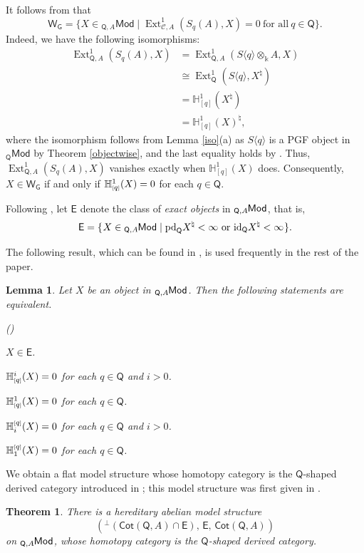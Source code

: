 \documentclass{amsart}
\theoremstyle{bfupright head,slanted body}
\theoremstyle{bfupright head,upright body}
\theoremstyle{fixed bf head,slanted body}
\newtheorem{thm}[res]{Theorem}          \newtheorem*{thm*}{Theorem}
\newtheorem{lem}[res]{Lemma}            \newtheorem*{lem*}{Lemma}
\theoremstyle{fixed bf head,upright body}
\theoremstyle{numbered paragraph}
\newlength{\thmlistleft}        %
\newlength{\thmlistright}       %
\newlength{\thmlistpartopsep}   %
\newlength{\thmlisttopsep}      %
\newlength{\thmlistparsep}      %
\newlength{\thmlistitemsep}     %
\newcounter{eqc}
\newenvironment{eqc}{\begin{list}{\upshape (\textit{\roman{eqc}})}%
		{\usecounter{eqc}%
			\setlength{\leftmargin}{\thmlistleft}%
			\setlength{\labelwidth}{\thmlistleft}%
			\setlength{\rightmargin}{\thmlistright}%
			\setlength{\partopsep}{\thmlistpartopsep}%
			\setlength{\topsep}{\thmlisttopsep}%
			\setlength{\parsep}{\thmlistparsep}%
			\setlength{\itemsep}{\thmlistitemsep}}}%
	{\end{list}}%
\newenvironment{prf*}[1][Proof]{%
	\begin{proof}[\bf #1]
		\setcounter{equation}{0}
		\renewcommand{\theequation}{\arabic{equation}}}
	{\end{proof}
}
\numberwithin{equation}{res}
\newcommand{\setof}[3][\mspace{1mu}]{\{#1#2 \mid #3#1\}}
\newcommand{\Cot}[1]{\mathsf{Cot}(#1)}
\newcommand{\Mod}[1]{{_{#1}\mathsf{Mod}}}
\newcommand{\Ext}[4][]{\operatorname{Ext}_{#1}^{#2}(#3,#4)}
\newcommand{\hH}[2][1]{\mathbb{H}_{#1}^{\textnormal{\tiny[}#2\textnormal{\tiny]}}}
\newcommand{\cH}[2][1]{\mathbb{H}^{#1}_{\textnormal{\tiny[}#2\textnormal{\tiny]}}}
\newcommand{\E}{\mathsf{E}}
\newcommand{\WG}{\mathsf{W}_{\mathsf{G}}}
\newcommand{\C}{\mathcal{C}}
\newcommand{\Q}{\mathsf{Q}}
\newcommand{\pd}{\mbox{\rm pd}}
\newcommand{\id}{\mathrm{id}}
\newcommand{\kk}{\Bbbk}
\newcommand{\lMod}[1]{{}_{#1}\mspace{-1mu}{\sf{Mod}}}
\begin{document}
\begin{prf*}
It follows from \cite[Lemma 5.1]{SV26} that
$$\WG=\{X\in \Mod{\Q,A}\mid \Ext[\C,A]{1}{S_{q}(A)}{X}=0 \ \text{for all} \ q\in \Q \}.$$
Indeed, we have the following isomorphisms:
\begin{align*}
\Ext[\Q,A]{1}{S_{q}(A)}{X}&=\Ext[\Q,A]{1}{S\langle q\rangle\otimes_{\kk}A}{X}\\
&\cong\Ext[\Q]{1}{S\langle q\rangle}{X^{\natural}}\\
&= \mathbb{H}_{[q]}^{1}(X^{\natural})\\
&= \mathbb{H}_{[q]}^{1}(X)^{\natural},
\end{align*}
where the isomorphism follows from Lemma \ref{iso}(a) as $S\langle q\rangle$ is a PGF object in $\Mod{\Q}$ by Theorem \ref{objectwise}, and
the last equality holds by \cite[Remark 7.12]{HJ21}.
Thus, $\Ext[\Q,A]{1}{S_{q}(A)}{X}$ vanishes exactly when $\mathbb{H}_{[q]}^{1}(X)$ does. Consequently, $X\in\WG$ if and only if $\cH[1]{q}(X)=0$ for each $q\in\Q$.
\end{prf*}

Following \cite[Definition 4.1]{HJ21}, let $\E$ denote the class of \emph{exact objects} in $\lMod{\Q,A}$, that is,
$$\E=\setof{X\in\lMod{\Q,A}}{\pd_{\Q}X^{\natural}<\infty\ \mathrm{or}\ \id_{\Q}X^{\natural}<\infty}.$$

The following result, which can be found in \cite[Theorem 7.1]{HJ21}, is used frequently in the rest of the paper.

\begin{lem}\label{thm7.1}
Let $X$ be an object in $\lMod{\Q,A}$. Then the following statements are equivalent.
\begin{eqc}
\item $X\in\E$.
\item $\cH[i]{q}{(X)}=0$ for each $q\in\Q$ and $i>0$.
\item $\cH[1]{q}{(X)}=0$ for each $q\in\Q$.
\item $\hH[i]{q}{(X)}=0$ for each $q\in\Q$ and $i>0$.
\item $\hH[1]{q}{(X)}=0$ for each $q\in\Q$.
\end{eqc}
\end{lem}

We obtain a flat model structure whose homotopy category is the $\Q$-shaped derived category introduced in \cite{HJ21}; this model structure was first given in \cite[Corollary 2.8]{DLLM}.

\begin{thm}\label{flat model structure}
There is a hereditary abelian model structure
$$(^{\perp}(\Cot{\Q,A}\cap\E), \, \E, \, \Cot{\Q,A})$$
on $\lMod{\Q,A}$, whose homotopy category is the $\Q$-shaped derived category.
\end{thm}
\end{document}
